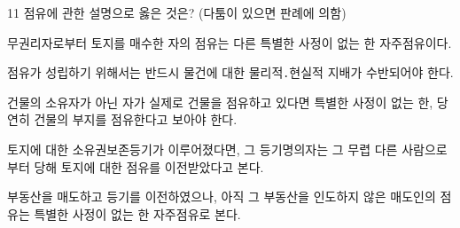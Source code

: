 \begin{question}{11}
점유에 관한 설명으로 옳은 것은? (다툼이 있으면 판례에 의함)
\begin{choices}
  \item 무권리자로부터 토지를 매수한 자의 점유는 다른 특별한 사정이 없는 한 자주점유이다.
  \item 점유가 성립하기 위해서는 반드시 물건에 대한 물리적․현실적 지배가 수반되어야 한다.
  \item 건물의 소유자가 아닌 자가 실제로 건물을 점유하고 있다면 특별한 사정이 없는 한, 당연히 건물의 부지를 점유한다고 보아야 한다.
  \item 토지에 대한 소유권보존등기가 이루어졌다면, 그 등기명의자는 그 무렵 다른 사람으로부터 당해 토지에 대한 점유를 이전받았다고 본다.
  \item 부동산을 매도하고 등기를 이전하였으나, 아직 그 부동산을 인도하지 않은 매도인의 점유는 특별한 사정이 없는 한 자주점유로 본다.
\end{choices}
\end{question}
